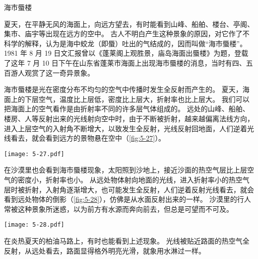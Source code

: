 \begin{Reading}{海市蜃楼}

夏天，在平静无风的海面上，向远方望去，有时能看到山峰、船舶、楼台、亭阁、集市、庙宇等出现在远方的空中。
古人不明白产生这种景象的原因，对它作了不科学的解释，认为是海中蛟龙（即蜃）吐出的气结成的，因而叫做“海市蜃楼”。
1981 年 8 月 19 日文汇报曾以《蓬莱阁上观胜景，庙岛海面出蜃楼》为题，登载了这年 7 月 10 日下午在山东省蓬莱市海面上出现海市蜃楼的消息，当时有四、五百游人观赏了这一奇异景象。

海市蜃楼是光在密度分布不均匀的空气中传播时发生全反射而产生的。
夏天，海面上的下层空气，温度比上层低，密度比上层大，折射率也比上层大。
我们可以把海面上的空气看作是由折射率不同的许多层气体组成的。
远处的山峰、船舶、楼房、人等反射出来的光线射向空中时，由于不断被折射，越来越偏离法线方向，进入上层空气的入射角不断增大，以致发生全反射，光线反射回地面，人们逆着光线看去，就会看到远方的景物悬在空中（\cref{fig:5-27}）。
\begin{figurehere}
  \begin{minipage}{\linewidth}\centering
    \texttt{[image: 5-27.pdf]}
    \caption{海市蜃楼}\label{fig:5-27}
  \end{minipage}
\end{figurehere}

在沙漠里也会看到海市蜃楼现象，太阳照到沙地上，接近沙面的热空气层比上层空气的密度小，折射率也小。
从远处物体射向地面的光线，进入折射率小的热空气层时被折射，入射角逐渐增大，也可能发生全反射，人们逆着反射光线看去，就会看到远处物体的倒影（\cref{fig:5-28}），仿佛是从水面反射出来的一样。
沙漠里的行人常被这种景象所迷惑，以为前方有水源而奔向前去，但总是可望而不可及。
\begin{figurehere}
  \begin{minipage}{\linewidth}\centering
    \texttt{[image: 5-28.pdf]}
    \caption{沙漠里的海市蜃楼}\label{fig:5-28}
  \end{minipage}
\end{figurehere}

在炎热夏天的柏油马路上，有时也能看到上述现象。
光线被贴近路面的热空气全反射，从远处看去，路面显得格外明亮光滑，就象用水淋过一样。
\end{Reading}


